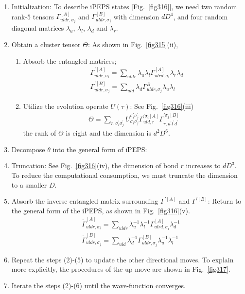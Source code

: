 \begin{enumerate}
	\item Initialization: To describe iPEPS states [Fig.~\ref{fig316}], we need two random rank-5 tensors $\Gamma^{[A]}_{uldr,\sigma_j}$ and $\Gamma^{[B]}_{uldr, \sigma_j}$ with dimension $dD^4$, and four random diagonal matrices $\lambda_{u}$, $\lambda_{l}$, $\lambda_{d}$ and $\lambda_{r}$.
	\item Obtain a cluster tensor $\Theta$: As shown in Fig.~\ref{fig315}(ii),
		\begin{enumerate}
			\item Absorb the entangled matrices; 
				\begin{align}
					&\Gamma^{\prime [A]}_{uldr,\sigma_i} = \sum_{uldr}{ \lambda_{u}\lambda_{l} \Gamma^{[A]}_{ulrd,\sigma_i} \lambda_{r} \lambda_{d}} \\
					&\Gamma^{\prime [B]}_{uldr,\sigma_j} = \sum_{uld}{\lambda_{d} \Gamma^{B}_{uldr,\sigma_j} \lambda_{u}\lambda_{l}}
				\end{align}
			\item Utilize the evolution operate $U(\tau)$: See Fig.~\ref{fig316}(iii)
				\begin{align}
					\Theta = \sum_{r,\sigma_i^{\prime}\sigma_j^{\prime}}{U^{\sigma_i^{\prime}\sigma_j^{\prime}}_{\sigma_i\sigma_j} \Gamma^{\prime\sigma_i [A]}_{uld,r} \Gamma^{\prime \sigma_j[B]}_{r,u^{\prime} l^{\prime} d^{\prime}}}
				\end{align}
				the rank of $\Theta$ is eight and the dimension is $d^2D^6$.
			\end{enumerate}
		\item Decompose $\theta$ into the general form of iPEPS:
		\item Truncation: See Fig.~\ref{fig316}(iv), the dimension of bond $r$ increases to $dD^3$. To reduce the computational consumption, we must truncate the dimension to a smaller $D$.
		\item Absorb the inverse entangled matrix surrounding $\Gamma^{\prime [A]}$ and $\Gamma^{\prime [B]}$: Return to the general form of the iPEPS, as shown in Fig.~\ref{fig316}(v).
				\begin{align}
					&\widetilde{\Gamma}^{[A]}_{uldr,\sigma_i} = \sum_{uldr}{ \lambda_{u}^{-1} \lambda_{l}^{-1} \Gamma^{[A]}_{ulrd,\sigma_i} \lambda_{d}^{-1}} \\
					&\widetilde{\Gamma}^{[B]}_{uldr,\sigma_j} = \sum_{uld}{\lambda_{d}^{-1} \Gamma^{[B]}_{uldr,\sigma_j} \lambda_{u}^{-1} \lambda_{l}^{-1}}
				\end{align}
			\item Repeat the steps (2)-(5) to update the other directional moves. To explain more explicitly, the procedures of the up move are shown in Fig.~\ref{fig317}.
			\item Iterate the steps (2)-(6) until the wave-function converges.
			
\end{enumerate}


